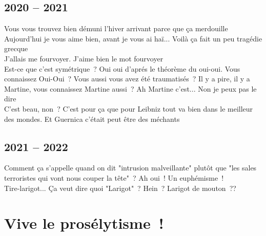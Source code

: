 \documentclass[french, a4paper, openany]{book}
\begin{document}
	\subsection*{2020 -- 2021}
		\noindent \og Vous vous trouvez bien démuni l'hiver arrivant parce que ça merdouille \fg \\
		\og Aujourd'hui je vous aime bien, avant je vous ai haï... Voilà ça fait un peu tragédie grecque \fg \\
		\og J'allais me fourvoyer. J'aime bien le mot fourvoyer \fg \\
		\og Est-ce que c'est symétrique~? Oui oui d'aprés le théorème du oui-oui. Vous connaissez Oui-Oui~? Vous aussi vous avez été traumatisés~? Il y a pire, il y a Martine, vous connaissez Martine aussi~? Ah Martine c'est... Non je peux pas le dire \fg \\
		\og C'est beau, non~? C'est pour ça que pour Leibniz tout va bien dans le meilleur des mondes. Et Guernica c'était peut être des méchants \fg \\	

	\subsection*{2021 -- 2022}
		\noindent \og Comment ça s'appelle quand on dit "intrusion malveillante" plutôt que "les sales terroristes qui vont nous couper la tête"~? Ah oui~! Un euphémisme~! \fg \\
		\og Tire-larigot... Ça veut dire quoi "Larigot"~? Hein~? Larigot de mouton~?? \fg \\

\section*{Vive le prosélytisme~!} 
\end{document}
